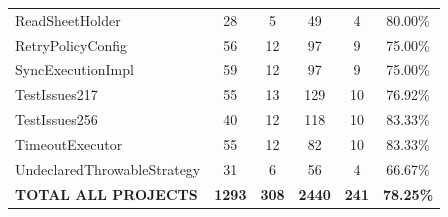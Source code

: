 \begin{table}[h]
\begin{tabular}{lccccc}
ReadSheetHolder & 28 & 5 & 49 & 4 & 80.00\% \\
RetryPolicyConfig & 56 & 12 & 97 & 9 & 75.00\% \\
SyncExecutionImpl & 59 & 12 & 97 & 9 & 75.00\% \\
TestIssues217 & 55 & 13 & 129 & 10 & 76.92\% \\
TestIssues256 & 40 & 12 & 118 & 10 & 83.33\% \\
TimeoutExecutor & 55 & 12 & 82 & 10 & 83.33\% \\
UndeclaredThrowableStrategy & 31 & 6 & 56 & 4 & 66.67\% \\
\midrule
\textbf{TOTAL ALL PROJECTS} & \textbf{1293} & \textbf{308} & \textbf{2440} & \textbf{241} & \textbf{78.25\%} \\
\bottomrule
\end{tabular}
\end{table}


